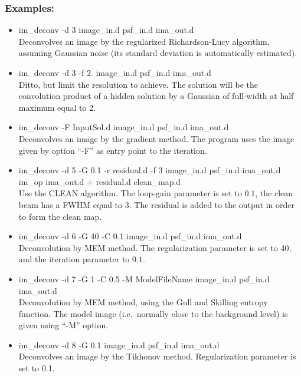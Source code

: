 \begin{itemize}
\subsubsection*{Examples:}
\begin{itemize}
\baselineskip=0.4truecm
\item im\_deconv -d 3 image\_in.d psf\_in.d ima\_out.d \\
Deconvolves an image by the regularized Richardson-Lucy algorithm, assuming
 Gaussian noise (its standard deviation is automatically estimated).
 \item im\_deconv -d 3 -f 2. image\_in.d psf\_in.d ima\_out.d \\
 Ditto, but limit the resolution to achieve. The solution will be the 
 convolution product of a hidden solution by a Gaussian of full-width at
 half maximum equal to 2.
 \item im\_deconv -F InputSol.d image\_in.d psf\_in.d ima\_out.d \\
 Deconvolves an image by the gradient method. The program uses the image
 given by option ``-F'' as entry point to the iteration.
 \item im\_deconv -d 5 -G 0.1 -r residual.d -f 3 image\_in.d psf\_in.d ima\_out.d \\
    im\_op ima\_out.d + residual.d clean\_map.d \\
 Use the CLEAN algorithm. The loop-gain parameter is set to $0.1$, the 
 clean beam has a FWHM equal to 3. The residual is added to the output
 in order to form the clean map.
 \item im\_deconv -d 6 -G 40 -C 0.1 image\_in.d psf\_in.d ima\_out.d \\
 Deconvolution by MEM method. The regularization parameter is set to 40,
 and the iteration parameter to $0.1$.
  \item im\_deconv -d 7 -G 1 -C 0.5 -M ModelFileName image\_in.d psf\_in.d ima\_out.d \\
 Deconvolution by MEM method, using the Gull and Skilling entropy function.
 The model image (i.e.\ normally close to the background level) is given
 using ``-M'' option.
 \item im\_deconv -d 8 -G 0.1 image\_in.d psf\_in.d ima\_out.d \\
 Deconvolves an image by the  Tikhonov method. Regularization parameter is
  set to 0.1.
\end{itemize}



\end{itemize}
